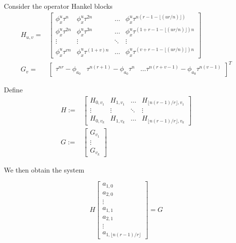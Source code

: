 \documentclass[sigconf]{acmart}
\begin{document}
Consider the operator Hankel blocks
\begin{align*}
H_{u,v} = & \begin{bmatrix}
\phi_x^u\tau^{n} & \phi_x^u\tau^{2n} & \ldots & \phi_x^u\tau^{n (r - 1 - \lfloor(ur/n) \rfloor)} \\
\phi_x^u\tau^{2n} & \phi_x^u\tau^{3n} & \ldots & \phi_x^u\tau^{(1 + r - 1 - \lfloor(ur/n) \rfloor)n} \\ \vdots & \vdots & \ddots & \vdots \\ \phi_x^u\tau^{vn} & \phi_x^u\tau^{(1+v)n} & \ldots & \phi_x^u\tau^{(v +  r - 1 - \lfloor(ur/n) \rfloor) n}
\end{bmatrix}
\\
    G_{v} = &\begin{bmatrix}
    \tau^{nr} - \phi_{a_0} & \tau^{n(r+1)} - \phi_{a_0}\tau^n & \ldots \tau^{n(r+v -1)} - \phi_{a_0}\tau^{n(v-1)}
    \end{bmatrix}^T
\end{align*}

Define
\begin{align*}
H:= & \begin{bmatrix}
H_{0,v_1} & H_{1, v_1} & \ldots & H_{\lfloor n (r- 1)/r \rfloor, v_1} \\ \vdots & \vdots & \ddots & \vdots \\ H_{0,v_k} & H_{1, v_k} & \ldots & H_{\lfloor n (r-1)/r \rfloor, v_k}
\end{bmatrix}\\
G:= & \begin{bmatrix}
G_{v_1} \\ \vdots \\ G_{v_k}
\end{bmatrix}
\end{align*}

We then obtain the system

\begin{equation*}
H
\begin{bmatrix}
a_{1,0} \\ a_{2,0} \\ \vdots \\ a_{1,1} \\ a_{2,1} \\ \vdots \\ a_{1, \lfloor n (r-1)/r \rfloor}
\end{bmatrix} = G
\end{equation*}
\end{document}
